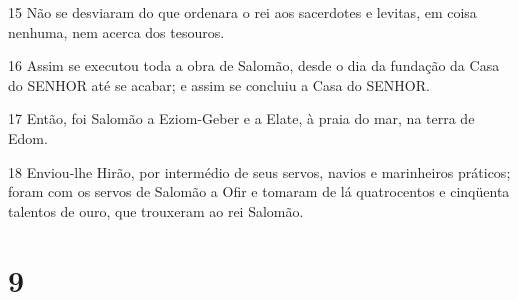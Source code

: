 \par 15 Não se desviaram do que ordenara o rei aos sacerdotes e levitas, em coisa nenhuma, nem acerca dos tesouros.
\par 16 Assim se executou toda a obra de Salomão, desde o dia da fundação da Casa do SENHOR até se acabar; e assim se concluiu a Casa do SENHOR.
\par 17 Então, foi Salomão a Eziom-Geber e a Elate, à praia do mar, na terra de Edom.
\par 18 Enviou-lhe Hirão, por intermédio de seus servos, navios e marinheiros práticos; foram com os servos de Salomão a Ofir e tomaram de lá quatrocentos e cinqüenta talentos de ouro, que trouxeram ao rei Salomão.

\chapter{9}

